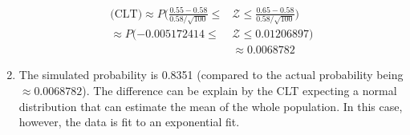 \documentclass{article}
\begin{document}
\begin{enumerate}[label=\alph*)]
\begin{align*}
              \text{(CLT)} \approx P(\frac{0.55 - 0.58}{0.58/\sqrt{100}} \leq & \mathcal{Z} \leq \frac{0.65 - 0.58}{0.58/\sqrt{100}}) \\
              \approx P(-0.005172414 \leq & \mathcal{Z} \leq 0.01206897)                                                              \\
              & \approx 0.0068782
          \end{align*}
    \item The simulated probability is 0.8351 (compared to the actual probability being \(\approx 0.0068782\)). The difference can be explain by the CLT expecting a normal distribution that can estimate the mean of the whole population. In this case, however, the data is fit to an exponential fit.
\end{enumerate}
\end{document}
